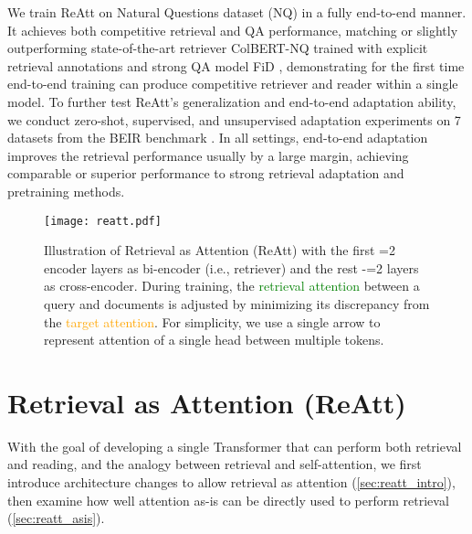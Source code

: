 \documentclass[11pt, dvipsnames]{article}
\newcommand{\ours}{ReAtt\xspace}
\begin{document}
We train \ours on Natural Questions dataset (NQ) \cite{nq-2019-kwiatkowski} in a fully end-to-end manner.
It achieves both competitive retrieval and QA performance, matching or slightly outperforming state-of-the-art retriever ColBERT-NQ \cite{colbertnq-2020-khattab} trained with explicit retrieval annotations and strong QA model FiD \cite{fid-2021-izacard,fid-kd-2021-izacard}, demonstrating for the first time end-to-end training can produce competitive retriever and reader within a single model.
To further test \ours's generalization and end-to-end adaptation ability, we conduct zero-shot, supervised, and unsupervised adaptation experiments on 7 datasets from the BEIR benchmark \cite{beir-2021-thakur}.
In all settings, end-to-end adaptation improves the retrieval performance usually by a large margin, achieving comparable or superior performance to strong retrieval adaptation and pretraining methods.

\begin{figure}[tb]
\texttt{[image: reatt.pdf]}
\centering
\caption{Illustration of Retrieval as Attention (\ours) with the first =2 encoder layers as bi-encoder (i.e., retriever) and the rest -=2 layers as cross-encoder. During training, the \textcolor{Green}{retrieval attention} between a query  and documents  is adjusted by minimizing its discrepancy from the \textcolor{Orange}{target attention}.
For simplicity, we use a single arrow to represent attention of a single head between multiple tokens.}
\label{fig:reatt}
\end{figure}

\section{Retrieval as Attention (\ours)}\label{sec:reatt}
With the goal of developing a single Transformer that can perform both retrieval and reading, and the analogy between retrieval and self-attention, we first introduce architecture changes to allow retrieval as attention (\autoref{sec:reatt_intro}), then examine how well attention as-is can be directly used to perform retrieval (\autoref{sec:reatt_asis}).
\end{document}
